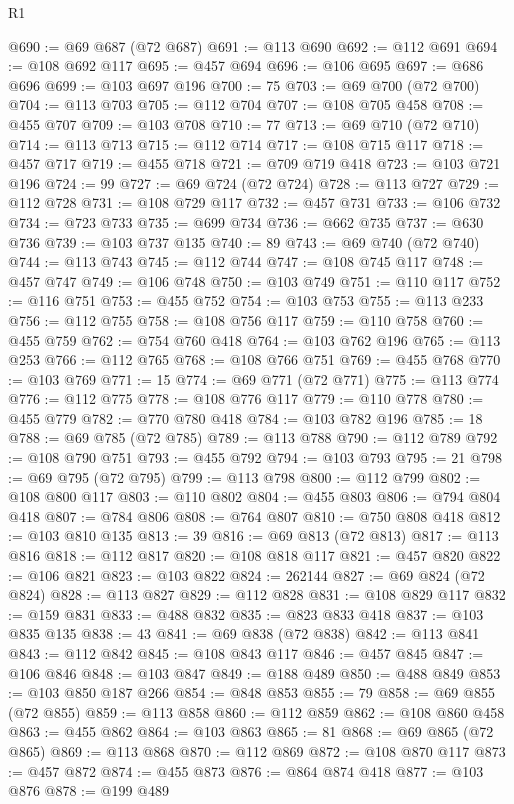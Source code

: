 \begin{lexlean}{R1}
\begin{coremodule}
@690 := @69 @687 (@72 @687)
@691 := @113 @690
@692 := @112 @691
@694 := @108 @692 @117
@695 := @457 @694
@696 := @106 @695
@697 := @686 @696
@699 := @103 @697 @196
@700 := 75
@703 := @69 @700 (@72 @700)
@704 := @113 @703
@705 := @112 @704
@707 := @108 @705 @458
@708 := @455 @707
@709 := @103 @708
@710 := 77
@713 := @69 @710 (@72 @710)
@714 := @113 @713
@715 := @112 @714
@717 := @108 @715 @117
@718 := @457 @717
@719 := @455 @718
@721 := @709 @719 @418
@723 := @103 @721 @196
@724 := 99
@727 := @69 @724 (@72 @724)
@728 := @113 @727
@729 := @112 @728
@731 := @108 @729 @117
@732 := @457 @731
@733 := @106 @732
@734 := @723 @733
@735 := @699 @734
@736 := @662 @735
@737 := @630 @736
@739 := @103 @737 @135
@740 := 89
@743 := @69 @740 (@72 @740)
@744 := @113 @743
@745 := @112 @744
@747 := @108 @745 @117
@748 := @457 @747
@749 := @106 @748
@750 := @103 @749
@751 := @110 @117
@752 := @116 @751
@753 := @455 @752
@754 := @103 @753
@755 := @113 @233
@756 := @112 @755
@758 := @108 @756 @117
@759 := @110 @758
@760 := @455 @759
@762 := @754 @760 @418
@764 := @103 @762 @196
@765 := @113 @253
@766 := @112 @765
@768 := @108 @766 @751
@769 := @455 @768
@770 := @103 @769
@771 := 15
@774 := @69 @771 (@72 @771)
@775 := @113 @774
@776 := @112 @775
@778 := @108 @776 @117
@779 := @110 @778
@780 := @455 @779
@782 := @770 @780 @418
@784 := @103 @782 @196
@785 := 18
@788 := @69 @785 (@72 @785)
@789 := @113 @788
@790 := @112 @789
@792 := @108 @790 @751
@793 := @455 @792
@794 := @103 @793
@795 := 21
@798 := @69 @795 (@72 @795)
@799 := @113 @798
@800 := @112 @799
@802 := @108 @800 @117
@803 := @110 @802
@804 := @455 @803
@806 := @794 @804 @418
@807 := @784 @806
@808 := @764 @807
@810 := @750 @808 @418
@812 := @103 @810 @135
@813 := 39
@816 := @69 @813 (@72 @813)
@817 := @113 @816
@818 := @112 @817
@820 := @108 @818 @117
@821 := @457 @820
@822 := @106 @821
@823 := @103 @822
@824 := 262144
@827 := @69 @824 (@72 @824)
@828 := @113 @827
@829 := @112 @828
@831 := @108 @829 @117
@832 := @159 @831
@833 := @488 @832
@835 := @823 @833 @418
@837 := @103 @835 @135
@838 := 43
@841 := @69 @838 (@72 @838)
@842 := @113 @841
@843 := @112 @842
@845 := @108 @843 @117
@846 := @457 @845
@847 := @106 @846
@848 := @103 @847
@849 := @188 @489
@850 := @488 @849
@853 := @103 @850 @187 @266
@854 := @848 @853
@855 := 79
@858 := @69 @855 (@72 @855)
@859 := @113 @858
@860 := @112 @859
@862 := @108 @860 @458
@863 := @455 @862
@864 := @103 @863
@865 := 81
@868 := @69 @865 (@72 @865)
@869 := @113 @868
@870 := @112 @869
@872 := @108 @870 @117
@873 := @457 @872
@874 := @455 @873
@876 := @864 @874 @418
@877 := @103 @876
@878 := @199 @489

\end{coremodule}
\end{lexlean}

